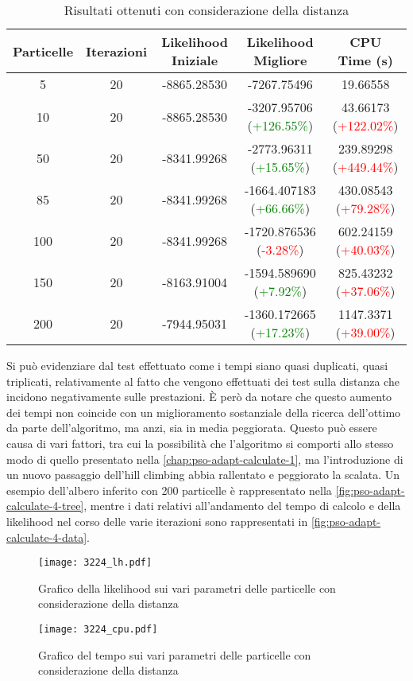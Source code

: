 \begin{table}[!h]
  \centering
  \begin{tabular}{*{5}{c}}
    Particelle & Iterazioni & Likelihood Iniziale & Likelihood Migliore & CPU Time (s) \\ \midrule \midrule
    5 & 20 & -8865.28530 & -7267.75496 & 19.66558 \\
    10 & 20 & -8865.28530 & -3207.95706 (\textcolor{green}{+126.55\%}) & 43.66173 (\textcolor{red}{+122.02\%}) \\
    50 & 20 & -8341.99268 & -2773.96311 (\textcolor{green}{+15.65\%}) & 239.89298 (\textcolor{red}{+449.44\%}) \\
    85 & 20 & -8341.99268 & -1664.407183 (\textcolor{green}{+66.66\%}) & 430.08543 (\textcolor{red}{+79.28\%}) \\
    100 & 20 & -8341.99268 & -1720.876536 (\textcolor{red}{-3.28\%}) & 602.24159 (\textcolor{red}{+40.03\%}) \\
    150 & 20 & -8163.91004 & -1594.589690 (\textcolor{green}{+7.92\%}) & 825.43232 (\textcolor{red}{+37.06\%}) \\
    200 & 20 & -7944.95031 & -1360.172665 (\textcolor{green}{+17.23\%}) & 1147.3371 (\textcolor{red}{+39.00\%}) \\
  \end{tabular}
  \caption{Risultati ottenuti con considerazione della distanza}
  \label{tab:pso-adapt-calculate-4-table}
\end{table}

Si può evidenziare dal test effettuato come i tempi siano quasi duplicati, quasi triplicati, relativamente al fatto che vengono effettuati dei test sulla distanza che incidono negativamente sulle prestazioni. È però da notare che questo aumento dei tempi non coincide con un miglioramento sostanziale della ricerca dell'ottimo da parte dell'algoritmo, ma anzi, sia in media peggiorata. Questo può essere causa di vari fattori, tra cui la possibilità che l'algoritmo si comporti allo stesso modo di quello presentato nella \autoref{chap:pso-adapt-calculate-1}, ma l'introduzione di un nuovo passaggio dell'hill climbing abbia rallentato e peggiorato la scalata. Un esempio dell'albero inferito con 200 particelle è rappresentato nella \autoref{fig:pso-adapt-calculate-4-tree}, mentre i dati relativi all'andamento del tempo di calcolo e della likelihood nel corso delle varie iterazioni sono rappresentati in \autoref{fig:pso-adapt-calculate-4-data}.

\begin{figure}[!h]
  \centering
  \begin{minipage}{.45 \textwidth}
  \centering
  \texttt{[image: 3224\_lh.pdf]}
  \caption{Grafico della likelihood sui vari parametri delle particelle con considerazione della distanza}
  \end{minipage}
  \begin{minipage}{.45 \textwidth}
    \centering
    \texttt{[image: 3224\_cpu.pdf]}
    \caption{Grafico del tempo sui vari parametri delle particelle con considerazione della distanza}
  \end{minipage}
  \label{fig:pso-adapt-calculate-1-graph}
\end{figure}

